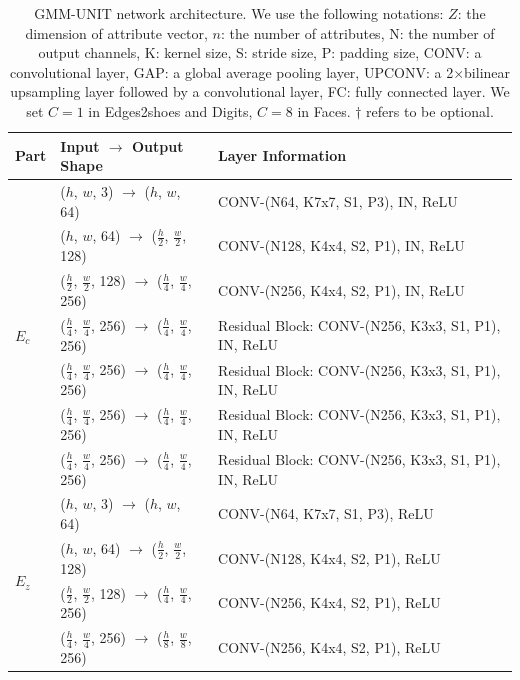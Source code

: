 \documentclass[runningheads]{llncs}
\begin{document}
\begin{table}[!ht]
	\centering
	\scriptsize
	\caption{GMM-UNIT network architecture. We use the following notations: $Z$: the dimension of attribute vector, $n$: the number of attributes, N: the number of output channels, K: kernel size, S: stride size, P: padding size, CONV: a convolutional layer, GAP: a global average pooling layer, UPCONV: a 2$\times$bilinear upsampling layer followed by a convolutional layer, FC: fully connected layer. We set $C=1$ in Edges2shoes and Digits, $C=8$ in Faces. $\dag$ refers to be optional.}
	\begin{tabular}{@{}lll@{}}
	    \toprule
	    \textbf{Part} & \textbf{Input} $\rightarrow$ \textbf{Output Shape} & \textbf{Layer Information} \\ \midrule
		\multirow{7}{*}{$E_c$} & ($h$, $w$, 3) $\rightarrow$ ($h$, $w$, 64) & CONV-(N64, K7x7, S1, P3), IN, ReLU \\
		& ($h$, $w$, 64) $\rightarrow$ ($\frac{h}{2}$, $\frac{w}{2}$, 128) & CONV-(N128, K4x4, S2, P1), IN, ReLU \\
		& ($\frac{h}{2}$, $\frac{w}{2}$, 128) $\rightarrow$ ($\frac{h}{4}$, $\frac{w}{4}$, 256) & CONV-(N256, K4x4, S2, P1), IN, ReLU \\ 
		& ($\frac{h}{4}$, $\frac{w}{4}$, 256) $\rightarrow$ ($\frac{h}{4}$, $\frac{w}{4}$, 256) & Residual Block: CONV-(N256, K3x3, S1, P1), IN, ReLU \\ 
		& ($\frac{h}{4}$, $\frac{w}{4}$, 256) $\rightarrow$ ($\frac{h}{4}$, $\frac{w}{4}$, 256) & Residual Block: CONV-(N256, K3x3, S1, P1), IN, ReLU \\ 
		& ($\frac{h}{4}$, $\frac{w}{4}$, 256) $\rightarrow$ ($\frac{h}{4}$, $\frac{w}{4}$, 256) & Residual Block: CONV-(N256, K3x3, S1, P1), IN, ReLU \\ 
		& ($\frac{h}{4}$, $\frac{w}{4}$, 256) $\rightarrow$ ($\frac{h}{4}$, $\frac{w}{4}$, 256) & Residual Block: CONV-(N256, K3x3, S1, P1), IN, ReLU \\ \midrule
		\multirow{8}{*}{$E_z$} & ($h$, $w$, 3) $\rightarrow$ ($h$, $w$, 64) & CONV-(N64, K7x7, S1, P3), ReLU \\
		& ($h$, $w$, 64) $\rightarrow$ ($\frac{h}{2}$, $\frac{w}{2}$, 128) & CONV-(N128, K4x4, S2, P1), ReLU \\
		& ($\frac{h}{2}$, $\frac{w}{2}$, 128) $\rightarrow$ ($\frac{h}{4}$, $\frac{w}{4}$, 256) & CONV-(N256, K4x4, S2, P1), ReLU \\ 
		& ($\frac{h}{4}$, $\frac{w}{4}$, 256) $\rightarrow$ ($\frac{h}{8}$, $\frac{w}{8}$, 256) & CONV-(N256, K4x4, S2, P1), ReLU \\

\end{tabular}
\end{table}
\end{document}
